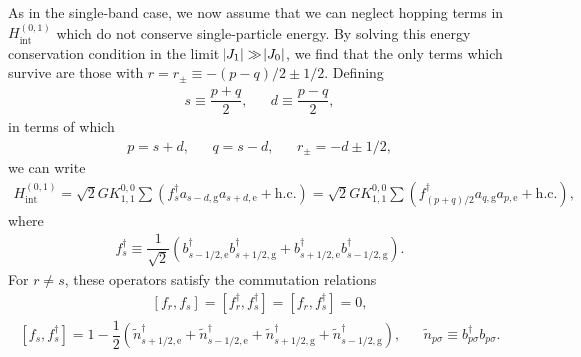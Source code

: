 \documentclass[aps,notitlepage,nofootinbib,10pt]{revtex4-1}
\renewcommand{\t}{\text} %
\newcommand{\f}[2]{\dfrac{#1}{#2}} %
\newcommand{\p}[1]{\left(#1\right)} %
\renewcommand{\sp}[1]{\left[#1\right]} %
\newcommand{\1}{\mathds{1}}
\newcommand{\g}{\text{g}}
\newcommand{\e}{\text{e}}
\begin{document}
As in the single-band case, we now assume that we can neglect hopping
terms in $H_{\t{int}}^{(0,1)}$ which do not conserve single-particle
energy.  By solving this energy conservation condition in the limit
$\abs{J_1}\gg\abs{J_0}$, we find that the only terms which survive are
those with $r=r_\pm\equiv-\p{p-q}/2\pm1/2$.  Defining
\begin{align}
  s \equiv \f{p+q}{2},
  &&
  d \equiv \f{p-q}{2},
\end{align}
in terms of which
\begin{align}
  p = s + d,
  &&
  q = s - d,
  &&
  r_\pm = -d \pm 1/2,
\end{align}
we can write
\begin{align}
  H_{\t{int}}^{(0,1)}
  = \sqrt{2} G K^{0,0}_{1,1} \sum
  \p{f_s^\dag a_{s-d,\g} a_{s+d,\e} + \t{h.c.}}
  = \sqrt{2} G K^{0,0}_{1,1} \sum
  \p{f_{\p{p+q}/2}^\dag a_{q,\g} a_{p,\e} + \t{h.c.}},
\end{align}
where
\begin{align}
  f_s^\dag \equiv \f1{\sqrt2}
  \p{b_{s-1/2,\e}^\dag b_{s+1/2,\g}^\dag
    + b_{s+1/2,\e}^\dag b_{s-1/2,\g}^\dag}.
\end{align}
For $r\ne s$, these operators satisfy the commutation relations
\begin{align}
  \sp{f_r, f_s} = \sp{f_r^\dag, f_s^\dag} = \sp{f_r, f_s^\dag} = 0,
\end{align}
\begin{align}
  \sp{f_s, f_s^\dag}
  = 1 - \f12 \p{\tilde n_{s+1/2,\e}^\dag + \tilde n_{s-1/2,\e}^\dag
    + \tilde n_{s+1/2,\g}^\dag + \tilde n_{s-1/2,\g}^\dag},
  &&
  \tilde n_{p\sigma} \equiv b_{p\sigma}^\dag b_{p\sigma}.
\end{align}
\end{document}
